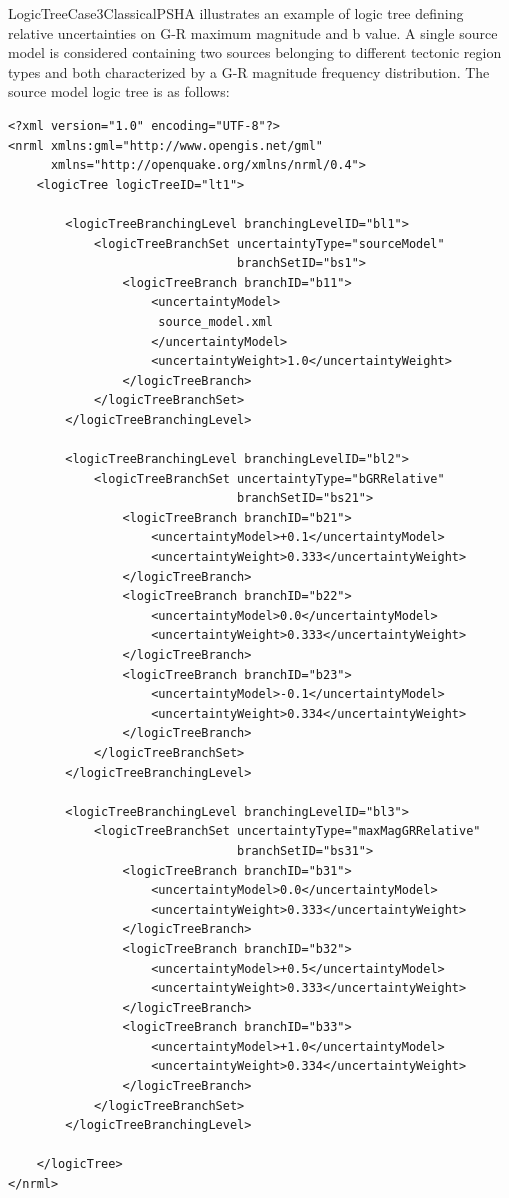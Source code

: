 LogicTreeCase3ClassicalPSHA illustrates an example of logic tree defining 
relative uncertainties on G-R maximum magnitude and b value.
A single source model is considered containing two sources belonging to 
different tectonic region types and both characterized by a G-R 
magnitude frequency distribution. The source model logic tree is as follows:
\begin{Verbatim}[frame=single, commandchars=\\\{\}, fontsize=\normalsize]
<?xml version="1.0" encoding="UTF-8"?>
<nrml xmlns:gml="http://www.opengis.net/gml"
      xmlns="http://openquake.org/xmlns/nrml/0.4">
    <logicTree logicTreeID="lt1">

        <logicTreeBranchingLevel branchingLevelID="bl1">
            <logicTreeBranchSet uncertaintyType="sourceModel"
                                branchSetID="bs1">
                <logicTreeBranch branchID="b11">
                    <uncertaintyModel>
                     source_model.xml
                    </uncertaintyModel>
                    <uncertaintyWeight>1.0</uncertaintyWeight>
                </logicTreeBranch>
            </logicTreeBranchSet>
        </logicTreeBranchingLevel>

        <logicTreeBranchingLevel branchingLevelID="bl2">
            <logicTreeBranchSet uncertaintyType="bGRRelative"
                                branchSetID="bs21">
                <logicTreeBranch branchID="b21">
                    <uncertaintyModel>+0.1</uncertaintyModel>
                    <uncertaintyWeight>0.333</uncertaintyWeight>
                </logicTreeBranch>
                <logicTreeBranch branchID="b22">
                    <uncertaintyModel>0.0</uncertaintyModel>
                    <uncertaintyWeight>0.333</uncertaintyWeight>
                </logicTreeBranch>
                <logicTreeBranch branchID="b23">
                    <uncertaintyModel>-0.1</uncertaintyModel>
                    <uncertaintyWeight>0.334</uncertaintyWeight>
                </logicTreeBranch>
            </logicTreeBranchSet>
        </logicTreeBranchingLevel>

        <logicTreeBranchingLevel branchingLevelID="bl3">
            <logicTreeBranchSet uncertaintyType="maxMagGRRelative"
                                branchSetID="bs31">
                <logicTreeBranch branchID="b31">
                    <uncertaintyModel>0.0</uncertaintyModel>
                    <uncertaintyWeight>0.333</uncertaintyWeight>
                </logicTreeBranch>
                <logicTreeBranch branchID="b32">
                    <uncertaintyModel>+0.5</uncertaintyModel>
                    <uncertaintyWeight>0.333</uncertaintyWeight>
                </logicTreeBranch>
                <logicTreeBranch branchID="b33">
                    <uncertaintyModel>+1.0</uncertaintyModel>
                    <uncertaintyWeight>0.334</uncertaintyWeight>
                </logicTreeBranch>
            </logicTreeBranchSet>
        </logicTreeBranchingLevel>

    </logicTree>
</nrml>
\end{Verbatim}
